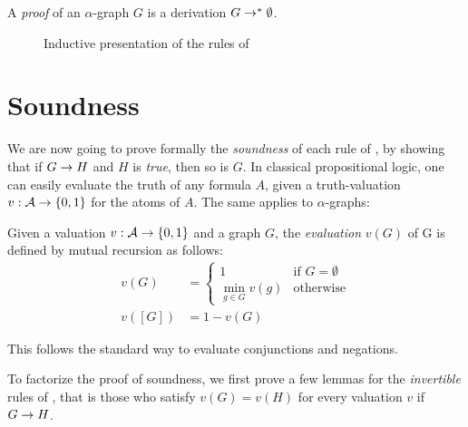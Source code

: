 \begin{definition}[Proof]
  A \emph{proof} of an $\alpha$-graph $G$ is a derivation $G \rightarrow^\ast \emptyset$.
\end{definition}

\begin{figure}
  
  \caption{Inductive presentation of the rules of }
\end{figure}


\section{Soundness}

We are now going to prove formally the \emph{soundness} of each rule of
, by showing that if $G \rightarrow H$ and $H$ is \emph{true}, then so is
$G$. In classical propositional logic, one can easily evaluate the truth of any
formula $A$, given a truth-valuation $v : \mathcal{A} \to \{0,1\}$ for the atoms of
$A$. The same applies to $\alpha$-graphs:

\begin{definition}

  Given a valuation $v : \mathcal{A} \to \{0,1\}$ and a graph $G$, the
  \emph{evaluation} $v(G)$ of G is defined by mutual recursion as follows:
  \begin{align*}
    v(G) &= \begin{cases}
      1 &\text{if $G = \emptyset$} \\
      \min_{g \in G}{v(g)} &\text{otherwise}
    \end{cases} \\
    v([G]) &= 1 - v(G)
  \end{align*}
\end{definition}

This follows the standard way to evaluate conjunctions and negations.

To factorize the proof of soundness, we first prove a few lemmas for the
\emph{invertible} rules of , that is those who satisfy $v(G) = v(H)$
for every valuation $v$ if $G \rightarrow H$.

